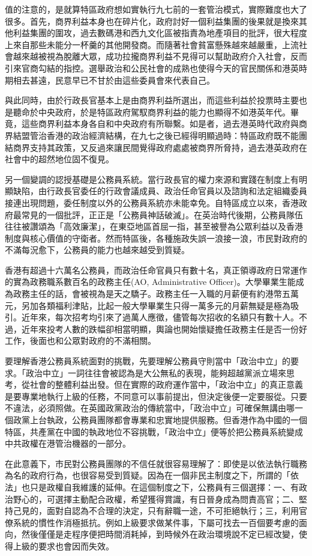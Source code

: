 值的注意的，是就算特區政府想如實執行九七前的一套管治模式，實際難度也大了很多。首先，商界利益本身也在碎片化，政府討好一個利益集團的後果就是換來其他利益集團的圍攻，過去數碼港和西九文化區被指責為地產項目的批評，很大程度上來自那些未能分一杯羹的其他開發商。而隨著社會貧富懸殊越來越嚴重，上流社會越來越被視為脫離大眾，成功拉攏商界利益不見得可以幫助政府介入社會，反而引來官商勾結的指控。選舉政治和公民社會的成熟也使得今天的官民關係和港英時期相去甚遠，民意早已不甘於由這些委員會來代表自己。

與此同時，由於行政長官基本上是由商界利益所選出，而這些利益於投票時主要也是聽命於中央政府，於是特區政府駕馭商界利益的能力也顯得不如港英年代。畢竟，這些商界利益本身各自和中央政府有所聯繫。如是者，過去港英時代政府與商界結盟管治香港的政治經濟結構，在九七之後已經得明顯過時：特區政府既不能團結商界支持其政策，又反過來讓民間覺得政府處處被商界所脅持，過去港英政府在社會中的超然地位固不復見。

另一個變調的認授基礎是公務員系統。當行政長官的權力來源和實踐在制度上有明顯缺陷，由行政長官委任的行政會議成員、政治任命官員以及諮詢和法定組織委員接連出現問題，委任制度以外的公務員系統亦未能幸免。自特區成立以來，香港政府最常見的一個批評，正正是「公務員神話破滅」。在英治時代後期，公務員隊伍往往被讚頌為「高效廉潔」，在東亞地區首屈一指，甚至被譽為公眾利益以及香港制度與核心價值的守衛者。然而特區後，各種施政失誤一浪接一浪，市民對政府的不滿每況愈下，公務員的能力也越來越受到質疑。

香港有超過十六萬名公務員，而政治任命官員只有數十名，真正領導政府日常運作的實為政務職系數百名的政務主任(AO, Administrative Officer)。大學畢業生能成為政務主任的話，會被視為是天之驕子。政務主任一入職的月薪便有約港幣五萬元，另加各類福利津貼，比起一般大學畢業生只得一萬多元的月薪無疑是極為吸引。近年來，每次招考均引來了過萬人應徵，儘管每次招收的名額只有數十人。不過，近年來投考人數的跌幅卻相當明顯，輿論也開始懷疑擔任政務主任是否一份好工作，後面也和公眾對政府的不滿相關。

要理解香港公務員系統面對的挑戰，先要理解公務員守則當中「政治中立」的要求。「政治中立」一詞往往會被認為是大公無私的表現，能夠超越黨派立場來思考，從社會的整體利益出發。但在實際的政府運作當中，「政治中立」的真正意義是要專業地執行上級的任務，不同意可以事前提出，但決定後便一定要服從。只要不違法，必須照做。在英國政黨政治的傳統當中，「政治中立」可確保無講由哪一個政黨上台執政，公務員團隊都會專業和忠實地提供服務。但香港作為中國的一個特區，共產黨在中國的執政地位不容挑戰，「政治中立」便等於把公務員系統變成中共政權在港管治機器的一部分。

在此意義下，市民對公務員團隊的不信任就很容易理解了：即使是以依法執行職務為名的政府行為，也很容易受到質疑。因為在一個非民主制度之下，所謂的「依法」也只是政權自我維護的延伸。在這個制度之下，公務員有三個選擇：一、有政治野心的，可選擇主動配合政權，希望獲得賞識，有日晉身成為問責高官；二、堅持己見的，面對自認為不合理的決定，只有辭職一途，不可拒絕執行；三，利用官僚系統的慣性作消極抵抗。例如上級要求做某件事，下屬可找去一百個要考慮的面向，然後僅僅是走程序便把時間消耗掉，到時候外在政治環境說不定已經改變，使得上級的要求也會因而失效。

